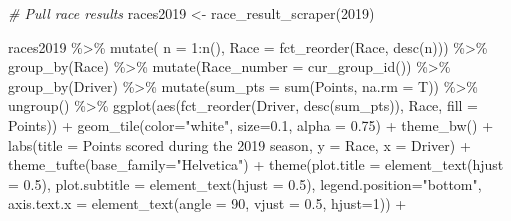 \documentclass[
]{book}
\newenvironment{Shaded}{\begin{snugshade}}{\end{snugshade}}
\newcommand{\AttributeTok}[1]{\textcolor[rgb]{0.77,0.63,0.00}{#1}}
\newcommand{\CommentTok}[1]{\textcolor[rgb]{0.56,0.35,0.01}{\textit{#1}}}
\newcommand{\DecValTok}[1]{\textcolor[rgb]{0.00,0.00,0.81}{#1}}
\newcommand{\FloatTok}[1]{\textcolor[rgb]{0.00,0.00,0.81}{#1}}
\newcommand{\FunctionTok}[1]{\textcolor[rgb]{0.00,0.00,0.00}{#1}}
\newcommand{\NormalTok}[1]{#1}
\newcommand{\OtherTok}[1]{\textcolor[rgb]{0.56,0.35,0.01}{#1}}
\newcommand{\SpecialCharTok}[1]{\textcolor[rgb]{0.00,0.00,0.00}{#1}}
\newcommand{\StringTok}[1]{\textcolor[rgb]{0.31,0.60,0.02}{#1}}
\begin{document}
\begin{Shaded}
\begin{Highlighting}[]
\CommentTok{\# Pull race results}
\NormalTok{races2019 }\OtherTok{\textless{}{-}} \FunctionTok{race\_result\_scraper}\NormalTok{(}\DecValTok{2019}\NormalTok{)}

\NormalTok{races2019 }\SpecialCharTok{\%\textgreater{}\%}
  \FunctionTok{mutate}\NormalTok{( }\AttributeTok{n =} \DecValTok{1}\SpecialCharTok{:}\FunctionTok{n}\NormalTok{(),}
          \AttributeTok{Race =} \FunctionTok{fct\_reorder}\NormalTok{(Race, }\FunctionTok{desc}\NormalTok{(n))) }\SpecialCharTok{\%\textgreater{}\%}
  \FunctionTok{group\_by}\NormalTok{(Race) }\SpecialCharTok{\%\textgreater{}\%} 
  \FunctionTok{mutate}\NormalTok{(}\AttributeTok{Race\_number =} \FunctionTok{cur\_group\_id}\NormalTok{()) }\SpecialCharTok{\%\textgreater{}\%}
  \FunctionTok{group\_by}\NormalTok{(Driver) }\SpecialCharTok{\%\textgreater{}\%} 
  \FunctionTok{mutate}\NormalTok{(}\AttributeTok{sum\_pts =} \FunctionTok{sum}\NormalTok{(Points, }\AttributeTok{na.rm =}\NormalTok{ T)) }\SpecialCharTok{\%\textgreater{}\%}
  \FunctionTok{ungroup}\NormalTok{() }\SpecialCharTok{\%\textgreater{}\%} 
  \FunctionTok{ggplot}\NormalTok{(}\FunctionTok{aes}\NormalTok{(}\FunctionTok{fct\_reorder}\NormalTok{(Driver, }\FunctionTok{desc}\NormalTok{(sum\_pts)), Race, }\AttributeTok{fill =}\NormalTok{ Points)) }\SpecialCharTok{+}
  \FunctionTok{geom\_tile}\NormalTok{(}\AttributeTok{color=}\StringTok{"white"}\NormalTok{, }\AttributeTok{size=}\FloatTok{0.1}\NormalTok{, }\AttributeTok{alpha =} \FloatTok{0.75}\NormalTok{) }\SpecialCharTok{+}
  \FunctionTok{theme\_bw}\NormalTok{() }\SpecialCharTok{+}
  \FunctionTok{labs}\NormalTok{(}\AttributeTok{title =} \StringTok{\textquotesingle{}Points scored during the 2019 season\textquotesingle{}}\NormalTok{,}
       \AttributeTok{y =} \StringTok{\textquotesingle{}Race\textquotesingle{}}\NormalTok{,}
       \AttributeTok{x =} \StringTok{\textquotesingle{}Driver\textquotesingle{}}\NormalTok{) }\SpecialCharTok{+} 
  \FunctionTok{theme\_tufte}\NormalTok{(}\AttributeTok{base\_family=}\StringTok{"Helvetica"}\NormalTok{)  }\SpecialCharTok{+}
  \FunctionTok{theme}\NormalTok{(}\AttributeTok{plot.title =} \FunctionTok{element\_text}\NormalTok{(}\AttributeTok{hjust =} \FloatTok{0.5}\NormalTok{),}
        \AttributeTok{plot.subtitle =} \FunctionTok{element\_text}\NormalTok{(}\AttributeTok{hjust =} \FloatTok{0.5}\NormalTok{),}
        \AttributeTok{legend.position=}\StringTok{"bottom"}\NormalTok{,}
        \AttributeTok{axis.text.x =} \FunctionTok{element\_text}\NormalTok{(}\AttributeTok{angle =} \DecValTok{90}\NormalTok{, }\AttributeTok{vjust =} \FloatTok{0.5}\NormalTok{, }\AttributeTok{hjust=}\DecValTok{1}\NormalTok{)) }\SpecialCharTok{+}

\end{Highlighting}
\end{Shaded}
\end{document}
